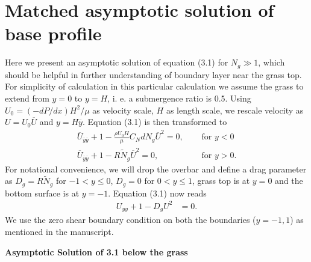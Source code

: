 \documentclass[12pt]{report}   %
\newcommand{\Ndg}{\tilde{N}_g}
\renewcommand{\bar}{\overline}
\begin{document}
%
\clearpage{\pagestyle{empty}\cleardoublepage}






\appendix

%
\clearpage{\pagestyle{empty}\cleardoublepage}

\chapter{Matched asymptotic solution of base profile}
Here we present an asymptotic solution of equation (3.1) for $N_g \gg 1$, which should be helpful in further understanding of boundary layer near the grass top. For simplicity of calculation in this particular calculation we assume the grass to extend from $y=0$ to $y=H$, i. e. a submergence ratio is 0.5. 
Using $ U_0 = (-dP/dx)H^2/\mu$ as velocity scale, $H$ as length scale, we rescale velocity as $U= U_0 \bar{U}$ and $y = H \bar{y}$. Equation (3.1) is then transformed to  
\begin{equation}
\begin{split}
 \bar{U}_{\bar{y}\bar{y}}+1 - \frac{\rho U_0 H}{\mu} C_N d N_g \bar{U}^2 =0, \quad &\text{ for } y<0\\
 \bar{U}_{\bar{y}\bar{y}}+1 - R \Ndg \bar{U}^2=0, \quad &\text{ for } y>0.
\end{split}
\end{equation}
For notational convenience, we will drop the overbar and define a drag parameter as $D_g = R\Ndg$ for $-1<y\le 0$, $D_g = 0$ for $0<y\le 1$, grass top is at $y=0$ and the bottom surface is at $y=-1$. Equation (3.1) now reads
\begin{equation}
\begin{split}
 {U}_{{y}{y}}+1 - D_g{U}^2 &=0.
\end{split}
\end{equation}
We use the zero shear boundary condition on both the boundaries ($y=-1,1$) as mentioned in the manuscript.

\vspace{2mm}
\noindent
\textbf{Asymptotic Solution of 3.1 below the grass}
\end{document}
